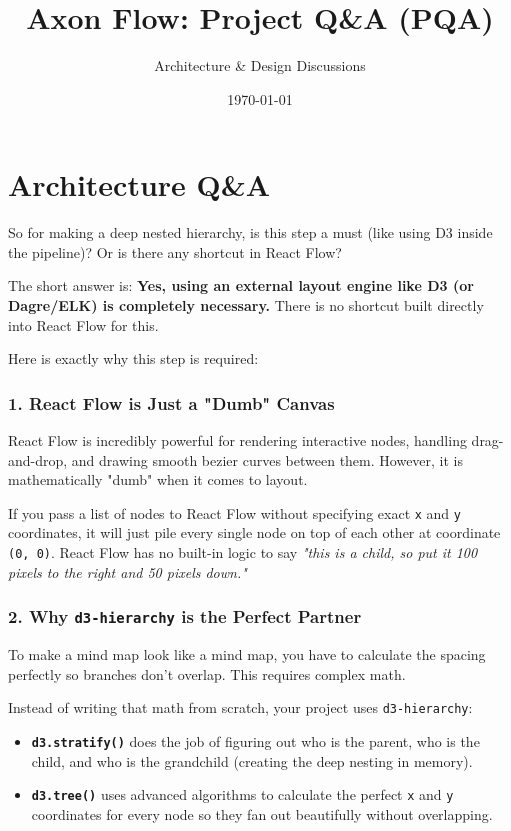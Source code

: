 \documentclass[12pt, a4paper]{article}
\title{\textbf{\color{axonpurple} Axon Flow: Project Q\&A (PQA)}}
\author{Architecture \& Design Discussions}
\date{\today}
\begin{document}
\maketitle

\section*{Architecture Q\&A}

\begin{questionbox}
So for making a deep nested hierarchy, is this step a must (like using D3 inside the pipeline)? Or is there any shortcut in React Flow?
\end{questionbox}

\begin{answerbox}[Answer]
The short answer is: \textbf{Yes, using an external layout engine like D3 (or Dagre/ELK) is completely necessary.} There is no shortcut built directly into React Flow for this.

Here is exactly why this step is required:

\subsubsection*{1. React Flow is Just a "Dumb" Canvas}
React Flow is incredibly powerful for rendering interactive nodes, handling drag-and-drop, and drawing smooth bezier curves between them. However, it is mathematically "dumb" when it comes to layout. 

If you pass a list of nodes to React Flow without specifying exact \texttt{x} and \texttt{y} coordinates, it will just pile every single node on top of each other at coordinate \texttt{(0, 0)}. React Flow has no built-in logic to say \textit{"this is a child, so put it 100 pixels to the right and 50 pixels down."}

\subsubsection*{2. Why \texttt{d3-hierarchy} is the Perfect Partner}
To make a mind map look like a mind map, you have to calculate the spacing perfectly so branches don't overlap. This requires complex math. 

Instead of writing that math from scratch, your project uses \texttt{d3-hierarchy}:
\begin{itemize}
    \item \textbf{\texttt{d3.stratify()}} does the job of figuring out who is the parent, who is the child, and who is the grandchild (creating the deep nesting in memory).
    \item \textbf{\texttt{d3.tree()}} uses advanced algorithms to calculate the perfect \texttt{x} and \texttt{y} coordinates for every node so they fan out beautifully without overlapping.
\end{itemize}


\end{answerbox}
\end{document}
